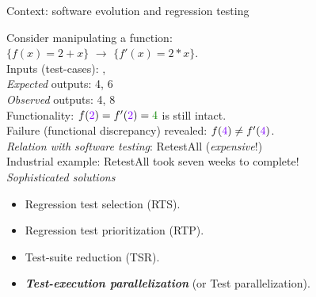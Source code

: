\documentclass{beamer}
\begin{document}
\begin{frame}{Context: software evolution and regression testing}
	
	{\rsm Consider manipulating a function}:\\
	$\{f(x)=2+x\}$ $\rightarrow$ $\{f'(x)=2*x\}$.\\
	\vspace{0.3cm}
	\pause
	Inputs (test-cases): {}, {}\\
	\textit{Expected} outputs: {\color{indiagreen}4}, {\color{indiagreen}6}\\\pause
	\textit{Observed} outputs: {\color{indiagreen}4}, {\color{red}8}\\
	\vspace{0.3cm}\pause
	{\color{indiagreen}Functionality}: $f({\rsm 2})=f'({\rsm 2})=\color{indiagreen}4$ is still intact.\\
	\vspace{0.3cm}\pause
	\vspace{-4mm}
	{\color{red} Failure} (functional discrepancy) revealed: $f({\rsm 4})\neq f'({\rsm 4})$.\\
	\vspace{0.3cm}\pause
	{\textit{Relation with software testing}: RetestAll ({\color{red}\textit{expensive}!})}\\
	Industrial example: RetestAll took seven weeks to complete!\onslide<6->\footnotemark\\\pause
	\vfill
	\textit{Sophisticated solutions}
	\begin{itemize}
		\item{Regression test {\rsm selection} (RTS).}
		\item{Regression test {\rsm prioritization} (RTP).}
		\item{Test-suite {\rsm reduction} (TSR).}\pause
		\item{\textbf{\color{blue}\textit{Test-execution parallelization}} (or Test parallelization).}
	\end{itemize}
\end{frame}
\end{document}
